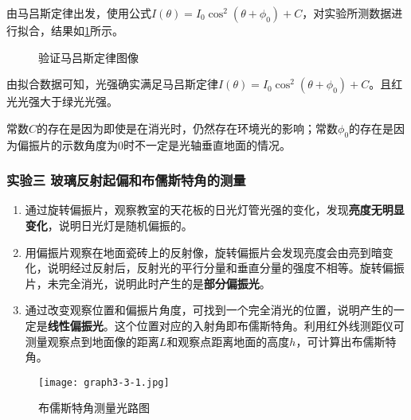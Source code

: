 \documentclass[dvipsnames, svgnames,a4paper,11pt]{article}
\begin{document}
	由马吕斯定律出发，使用公式$I(\theta)=I_0\cos^2(\theta+\phi_0)+C$，对实验所测数据进行拟合，结果如\cref{fig:graph3-2}所示。

	\begin{figure}[htbp]
		\centering
		\quad
		\quad
		\quad

		\caption{验证马吕斯定律图像}
		\label{fig:graph3-2}
		
	\end{figure}

	由拟合数据可知，光强确实满足马吕斯定律$I(\theta)=I_0\cos^2(\theta+\phi_0)+C$。且红光光强大于绿光光强。
	
	常数$C$的存在是因为即使是在消光时，仍然存在环境光的影响；常数$\phi_0$的存在是因为偏振片的示数角度为0时不一定是光轴垂直地面的情况。
			



	\subsubsection{实验三 \quad 玻璃反射起偏和布儒斯特角的测量}

	\begin{enumerate}
		\item 通过旋转偏振片，观察教室的天花板的日光灯管光强的变化，发现\textbf{亮度无明显变化}，说明日光灯是随机偏振的。
		\item 用偏振片观察在地面瓷砖上的反射像，旋转偏振片会发现亮度会由亮到暗变化，说明经过反射后，反射光的平行分量和垂直分量的强度不相等。旋转偏振片，未完全消光，说明此时产生的是\textbf{部分偏振光}。
		\item 通过改变观察位置和偏振片角度，可找到一个完全消光的位置，说明产生的一定是\textbf{线性偏振光}。这个位置对应的入射角即布儒斯特角。利用红外线测距仪可测量观察点到地面像的距离$L$和观察点距离地面的高度$h$，可计算出布儒斯特角。
	\end{enumerate}
	
	

	


	\begin{figure}[htbp]
		\centering
		\texttt{[image: graph3-3-1.jpg]}
		\caption{布儒斯特角测量光路图}
		\label{fig:graph3-3-1}
	\end{figure}
\end{document}
